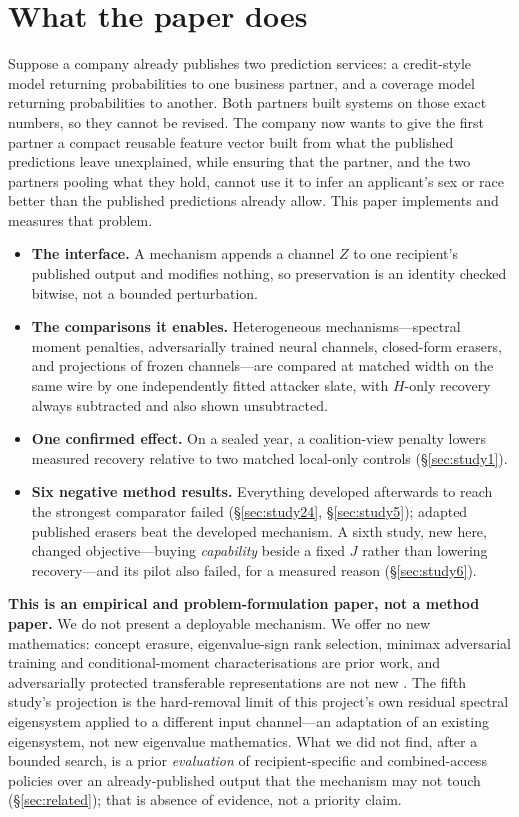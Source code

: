 \documentclass[10pt]{article}
\begin{document}
\section{What the paper does}
\label{sec:contribution}

Suppose a company already publishes two prediction services: a credit-style model returning
probabilities to one business partner, and a coverage model returning probabilities to another. Both
partners built systems on those exact numbers, so they cannot be revised. The company now wants to give
the first partner a compact reusable feature vector built from what the published predictions leave
unexplained, while ensuring that the partner, and the two partners pooling what they hold, cannot use it
to infer an applicant's sex or race better than the published predictions already allow. This paper
implements and measures that problem.

\begin{itemize}\itemsep1pt
\item \textbf{The interface.} A mechanism appends a channel $Z$ to one recipient's published output and
modifies nothing, so preservation is an identity checked bitwise, not a bounded perturbation.
\item \textbf{The comparisons it enables.} Heterogeneous mechanisms---spectral moment penalties,
adversarially trained neural channels, closed-form erasers, and projections of frozen channels---are
compared at matched width on the same wire by one independently fitted attacker slate, with $H$-only
recovery always subtracted and also shown unsubtracted.
\item \textbf{One confirmed effect.} On a sealed year, a coalition-view penalty lowers measured recovery
relative to two matched local-only controls (\S\ref{sec:study1}).
\item \textbf{Six negative method results.} Everything developed afterwards to reach the strongest
comparator failed (\S\ref{sec:study24}, \S\ref{sec:study5}); adapted published erasers beat the developed
mechanism. A sixth study, new here, changed objective---buying \emph{capability} beside a fixed $J$ rather
than lowering recovery---and its pilot also failed, for a measured reason (\S\ref{sec:study6}).
\end{itemize}

\textbf{This is an empirical and problem-formulation paper, not a method paper.} We do not present a
deployable mechanism. We offer no new mathematics: concept erasure, eigenvalue-sign rank selection,
minimax adversarial training and conditional-moment characterisations are prior work, and adversarially
protected transferable representations are not new \citep{madras2018laftr}. The fifth study's projection
is the hard-removal limit of this project's own residual spectral eigensystem applied to a different
input channel---an adaptation of an existing eigensystem, not new eigenvalue mathematics. What we did
not find, after a bounded search, is a prior \emph{evaluation} of recipient-specific and combined-access
policies over an already-published output that the mechanism may not touch (\S\ref{sec:related}); that
is absence of evidence, not a priority claim.
\end{document}
